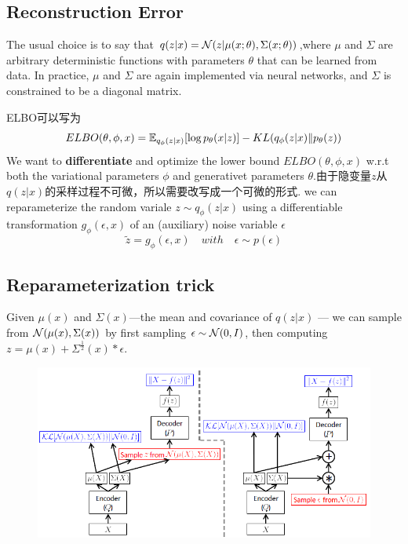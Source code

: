 \subsection{Reconstruction Error}
The usual choice is to say that $q(z|x) = \mathcal{N}(z| \mu(x; \theta), \Sigma(x; \theta))$,where
$\mu$ and $\Sigma$ are arbitrary deterministic functions with parameters $\theta$ that can be learned from data. In practice, $\mu$ and $\Sigma$
are again implemented via neural networks, and $\Sigma$ is constrained to be a diagonal matrix.

ELBO可以写为
\begin{equation}
    ELBO(\theta, \phi, x)
    = \mathbb{E}_{q_{\phi}(z|x)} [\log p_{\theta}(x | z)]
        - KL(q_{\phi}(z|x)\|p_{\theta}(z))
\end{equation}
We want to \textbf{differentiate} and optimize the lower bound $ELBO(\theta, \phi, x)$ w.r.t both the variational
parameters $\phi$ and generativet parameters $\theta$.由于隐变量$z$从$q(z|x)$的采样过程不可微，所以需要改写成一个可微的形式.
we can reparameterize the random variale $z \sim  q_{\phi}(z|x)$ using a differentiable transformation $g_{\phi}(\epsilon, x)$ of an
(auxiliary) noise variable $\epsilon$
\begin{equation}
    \tilde{z} = g_{\phi}(\epsilon, x) \quad with \quad \epsilon \sim p(\epsilon)
\end{equation}

\subsection{Reparameterization trick}
Given $\mu(x)$ and $\Sigma(x)$—the mean and covariance of $q(z|x)$ — we can sample from
$\mathcal{N}(\mu(x), \Sigma(x))$ by first sampling $\epsilon \sim \mathcal{N}(0, I)$, then computing
$z = \mu(x) + \Sigma^{\frac{1}{2}}(x) * \epsilon$.

\begin{figure}[H]
    \centering
    \includegraphics[width=12cm]{images/vae_reparameterization_trick.png}
    \label{fig:vae_reparameterization_trick}
\end{figure}

